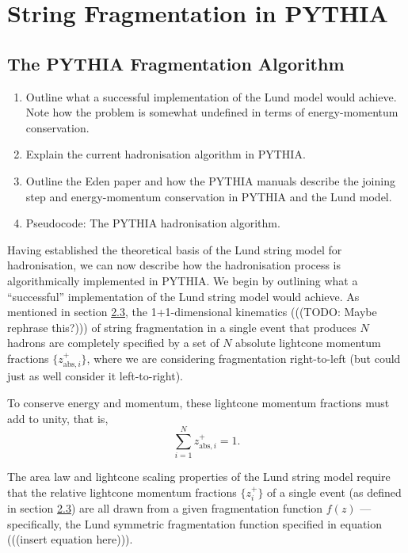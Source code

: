 \documentclass[12pt,a4paper]{report}
\begin{document}
\chapter{String Fragmentation in PYTHIA}
\label{chap:fragmentation}
\section{The PYTHIA Fragmentation Algorithm}
\begin{enumerate}
\item Outline what a successful implementation of the Lund model would achieve. Note how the problem is somewhat undefined in terms of energy-momentum conservation. 
\item Explain the current hadronisation algorithm in PYTHIA.
\item Outline the Eden paper and how the PYTHIA manuals describe the joining step and energy-momentum conservation in PYTHIA and the Lund model.
\item Pseudocode: The PYTHIA hadronisation algorithm.
  
\end{enumerate}

Having established the theoretical basis of the Lund string model for hadronisation, we can now describe how the hadronisation process is algorithmically implemented in PYTHIA. We begin by outlining what a ``successful'' implementation of the Lund string model would achieve. As mentioned in section \hyperref[sec:lsm]{2.3}, the 1+1-dimensional kinematics (((TODO: Maybe rephrase this?))) of string fragmentation in a single event that produces $N$ hadrons are completely specified by a set of $N$ absolute lightcone momentum fractions $\{ z_{\text{abs},i}^+ \}$, where we are considering fragmentation right-to-left (but could just as well consider it left-to-right).

To conserve energy and momentum, these lightcone momentum fractions must add to unity, that is,
\begin{equation}
  \sum_{i=1}^N z_{\text{abs},i}^+ = 1.
\end{equation}

The area law and lightcone scaling properties of the Lund string model require that the relative lightcone momentum fractions $\{ z_i^+ \}$ of a single event (as defined in section \hyperref[sec:lsm]{2.3}) are all drawn from a given fragmentation function $f(z)$ --- specifically, the Lund symmetric fragmentation function specified in equation (((insert equation here))).
\end{document}
